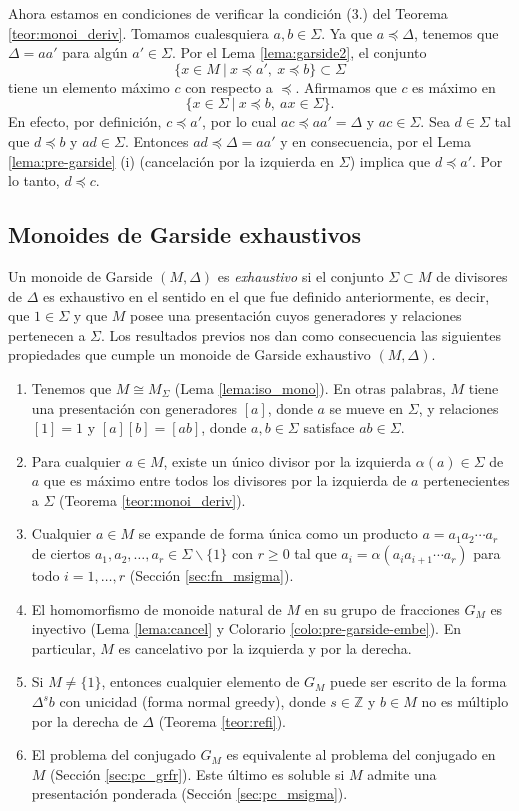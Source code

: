 \documentclass[12pt]{book}
\theoremstyle{definition}
\begin{document}
Ahora estamos en condiciones de verificar la condición (3.) del Teorema \ref{teor:monoi_deriv}. Tomamos cualesquiera $a,b\in\Sigma$. Ya que $a\preceq\Delta$, tenemos que $\Delta=aa'$ para algún $a'\in\Sigma$. Por el Lema \ref{lema:garside2}, el conjunto
$$\{x\in M\ |\ x\preceq a',\ x\preceq b\}\subset\Sigma$$ tiene un elemento máximo $c$ con respecto a $\preceq$. Afirmamos que $c$ es máximo en 
$$\{x\in\Sigma\ |\ x\preceq b,\ ax\in\Sigma\}.$$
En efecto, por definición, $c\preceq a'$, por lo cual $ac\preceq aa'=\Delta$ y $ac\in\Sigma$. Sea $d\in\Sigma$ tal que $d\preceq b$ y $ad\in\Sigma$. Entonces $ad\preceq\Delta=aa'$ y en consecuencia, por el Lema \ref{lema:pre-garside} (i) (cancelación por la izquierda en $\Sigma$) implica que $d\preceq a'$. Por lo tanto, $d\preceq c$.

\subsection{Monoides de Garside exhaustivos}

Un monoide de Garside $(M,\Delta)$ es \textit{exhaustivo} si el conjunto $\Sigma\subset M$ de divisores de $\Delta$ es exhaustivo en el sentido en el que fue definido anteriormente, es decir, que $1\in\Sigma$ y que $M$ posee una presentación cuyos generadores y relaciones pertenecen a $\Sigma$. Los resultados previos nos dan como consecuencia las siguientes propiedades que cumple un monoide de Garside exhaustivo $(M,\Delta)$.

\begin{enumerate}[label=(\arabic*)]
\item Tenemos que $M\cong M_\Sigma$ (Lema \ref{lema:iso_mono}). En otras palabras, $M$ tiene una presentación con generadores $[a]$, donde $a$ se mueve en $\Sigma$, y relaciones $[1]=1$ y $[a][b]=[ab]$, donde $a,b\in\Sigma$ satisface $ab\in\Sigma$.
\item Para cualquier $a\in M$, existe un único divisor por la izquierda $\alpha(a)\in\Sigma$ de $a$ que es máximo entre todos los divisores por la izquierda de $a$ pertenecientes a $\Sigma$ (Teorema \ref{teor:monoi_deriv}).
\item Cualquier $a\in M$ se expande de forma única como un producto $a=a_1a_2\cdots a_r$ de ciertos $a_1,a_2,\ldots,a_r\in\Sigma \backslash\{1\}$ con $r\geq 0$ tal que $a_i=\alpha(a_ia_{i+1}\cdots a_r)$ para todo $i=1,\ldots,r$ (Sección \ref{sec:fn_msigma}).
\item El homomorfismo de monoide natural de $M$ en su grupo de fracciones $G_M$ es inyectivo (Lema \ref{lema:cancel} y Colorario \ref{colo:pre-garside-embe}). En particular, $M$ es cancelativo por la izquierda y por la derecha.
\item Si $M\neq \{1\}$, entonces cualquier elemento de $G_M$ puede ser escrito de la forma $\Delta^s b$ con unicidad (forma normal greedy), donde $s\in\mathbb{Z}$ y $b\in M$ no es múltiplo por la derecha de $\Delta$ (Teorema \ref{teor:refi}).
\item El problema del conjugado $G_M$ es equivalente al problema del conjugado en $M$ (Sección \ref{sec:pc_grfr}). Este último es soluble si $M$ admite una presentación ponderada (Sección \ref{sec:pc_msigma}).
\end{enumerate}
\end{document}
